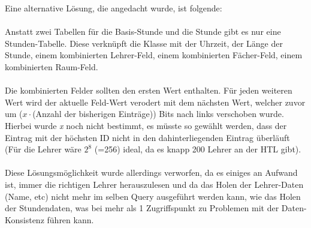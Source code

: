 Eine alternative Lösung, die angedacht wurde, ist folgende:\\
\\
Anstatt zwei Tabellen für die Basis-Stunde und die Stunde gibt es nur eine Stunden-Tabelle.
Diese verknüpft die Klasse mit der Uhrzeit, der Länge der Stunde, einem kombinierten Lehrer-Feld, einem kombinierten Fächer-Feld, einem kombinierten Raum-Feld.\\
\\
Die kombinierten Felder sollten den ersten Wert enthalten. Für jeden weiteren Wert wird der aktuelle Feld-Wert verodert mit dem nächsten Wert, welcher zuvor um ($x \cdot $(Anzahl der bisherigen Einträge)) Bits nach links verschoben wurde.\\
Hierbei wurde \textit{x} noch nicht bestimmt, es müsste so gewählt werden, dass der Eintrag mit der höchsten ID nicht in den dahinterliegenden Eintrag überläuft (Für die Lehrer wäre $2^{8}$ (=256) ideal, da es knapp 200 Lehrer an der HTL gibt).\\
\\
Diese Lösungsmöglichkeit wurde allerdings verworfen, da es einiges an Aufwand ist, immer die richtigen Lehrer herauszulesen und da das Holen der Lehrer-Daten (Name, etc) nicht mehr im selben Query ausgeführt werden kann, wie das Holen der Stundendaten, was bei mehr als 1 Zugriffspunkt zu Problemen mit der Daten-Konsistenz führen kann.
